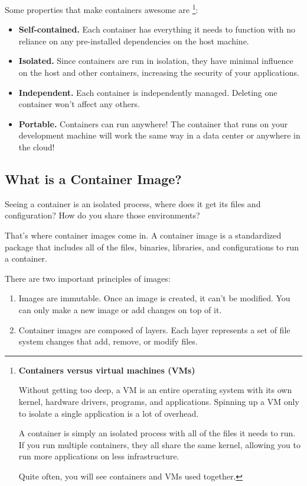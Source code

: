 Some properties that make containers awesome are
\footnote{
    \textbf{Containers versus virtual machines (VMs)}

    Without getting too deep, a VM is an entire operating
    system with its own kernel, hardware drivers, programs,
    and applications. Spinning up a VM only to isolate a
    single application is a lot of overhead.

    A container is simply an isolated process with all of
    the files it needs to run. If you run multiple containers,
    they all share the same kernel, allowing you to run more
    applications on less infrastructure.

    Quite often, you will see containers and VMs used together.
}:
\begin{itemize}
    \item \textbf{Self-contained.} Each container has everything
    it needs to function with no reliance on any pre-installed
    dependencies on the host machine.

    \item \textbf{Isolated.} Since containers are run in isolation,
    they have minimal influence on the host and other containers,
    increasing the security of your applications.

    \item \textbf{Independent.} Each container is independently
    managed. Deleting one container won't affect any others.

    \item \textbf{Portable.} Containers can run anywhere!
    The container that runs on your development machine will
    work the same way in a data center or anywhere in the cloud!
\end{itemize}



\subsection*{What is a Container Image?}
Seeing a container is an isolated process, where does it get its
files and configuration? How do you share those environments?

That's where container images come in. A container image is a
standardized package that includes all of the files, binaries,
libraries, and configurations to run a container.

There are two important principles of images:
\begin{enumerate}
    \item  Images are immutable. Once an image is created, it
    can't be modified. You can only make a new image or add
    changes on top of it.

    \item Container images are composed of layers. Each layer
    represents a set of file system changes that add, remove,
    or modify files.
\end{enumerate}



